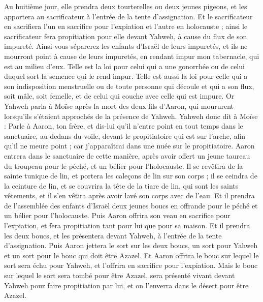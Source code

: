 \begin{multicols}{2}
Au huitième jour, elle prendra deux tourterelles ou deux jeunes pigeons, et les apportera au sacrificateur à l'entrée de la tente d'assignation.
Et le sacrificateur en sacrifiera l'un en sacrifice pour l'expiation et l'autre en holocauste ; ainsi le sacrificateur fera propitiation pour elle devant Yahweh, à cause du flux de son impureté.
Ainsi vous séparerez les enfants d'Israël de leurs impuretés, et ils ne mourront point à cause de leurs impuretés, en rendant impur mon tabernacle, qui est au milieu d'eux.
Telle est la loi pour celui qui a une gonorrhée ou de celui duquel sort la semence qui le rend impur.
Telle est aussi la loi pour celle qui a son indisposition menstruelle ou de toute personne qui découle et qui a son flux, soit mâle, soit femelle, et de celui qui couche avec celle qui est impure.
\VerseOne{}Or Yahweh parla à Moïse après la mort des deux fils d'Aaron, qui moururent lorsqu'ils s'étaient approchés de la présence de Yahweh.
Yahweh donc dit à Moïse : Parle à Aaron, ton frère, et dis-lui qu'il n'entre point en tout temps dans le sanctuaire, au-dedans du voile, devant le propitiatoire qui est sur l'arche, afin qu'il ne meure point ; car j'apparaîtrai dans une nuée sur le propitiatoire.
Aaron entrera dans le sanctuaire de cette manière, après avoir offert un jeune taureau du troupeau pour le péché, et un bélier pour l'holocauste.
Il se revêtira de la sainte tunique de lin, et portera les caleçons de lin sur son corps ; il se ceindra de la ceinture de lin, et se couvrira la tête de la tiare de lin, qui sont les saints vêtements, et il s'en vêtira après avoir lavé son corps avec de l'eau.
Et il prendra de l'assemblée des enfants d'Israël deux jeunes boucs en offrande pour le péché et un bélier pour l'holocauste.
Puis Aaron offrira son veau en sacrifice pour l'expiation, et fera propitiation tant pour lui que pour sa maison.
Et il prendra les deux boucs, et les présentera devant Yahweh, à l'entrée de la tente d'assignation.
Puis Aaron jettera le sort sur les deux boucs, un sort pour Yahweh et un sort pour le bouc qui doit être Azazel.
Et Aaron offrira le bouc sur lequel le sort sera échu pour Yahweh, et l'offrira en sacrifice pour l'expiation.
Mais le bouc sur lequel le sort sera tombé pour être Azazel, sera présenté vivant devant Yahweh pour faire propitiation par lui, et on l'enverra dans le désert pour être Azazel.

\end{multicols}
